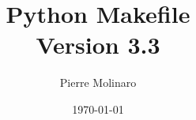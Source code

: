 \documentclass[a4paper,11pt]{extarticle}
\begin{document}
 


\title{\bf \Huge{Python Makefile\\Version 3.3}}
\author{Pierre Molinaro}
\date {\today}

\maketitle


\tableofcontents

\end{document}
